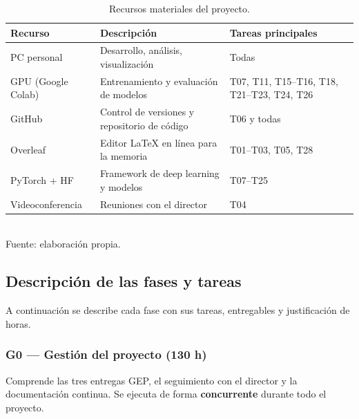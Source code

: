 \documentclass[11pt, a4paper]{article}
\begin{document}
\begin{table}[H]
\centering
\caption{Recursos materiales del proyecto.}
\label{tab:recursos}
\small
\begin{tabular}{@{}lll@{}}
\toprule
\textbf{Recurso} & \textbf{Descripción} & \textbf{Tareas principales} \\
\midrule
PC personal       & Desarrollo, análisis, visualización          & Todas \\
GPU (Google Colab) & Entrenamiento y evaluación de modelos        & T07, T11, T15--T16, T18, T21--T23, T24, T26 \\
GitHub             & Control de versiones y repositorio de código & T06 y todas \\
Overleaf           & Editor \LaTeX{} en línea para la memoria      & T01--T03, T05, T28 \\
PyTorch + HF       & Framework de deep learning y modelos         & T07--T25 \\
Videoconferencia   & Reuniones con el director                    & T04 \\
\bottomrule
\end{tabular}
\\[0.15cm]{\small Fuente: elaboración propia.}
\end{table}

\subsection{Descripción de las fases y tareas}
\label{sec:tareas}

A continuación se describe cada fase con sus tareas, entregables y justificación de horas.

\subsubsection{G0 --- Gestión del proyecto (130 h)}

Comprende las tres entregas GEP, el seguimiento con el director y la documentación continua. Se ejecuta de forma \textbf{concurrente} durante todo el proyecto.
\end{document}
